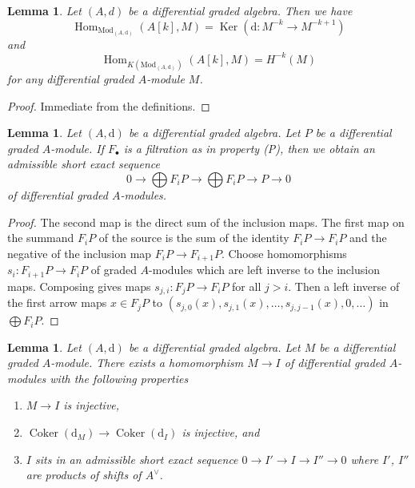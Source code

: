 \documentclass{stacks-project}
\theoremstyle{plain}
\newtheorem{lemma}[subsection]{Lemma}
\theoremstyle{definition}
\theoremstyle{remark}
\numberwithin{equation}{subsection}
\def\Hom{\mathop{\mathrm{Hom}}\nolimits}
\def\Ker{\mathop{\mathrm{Ker}}}
\def\Coker{\mathop{\mathrm{Coker}}}
\begin{document}
\begin{lemma}
\label{lemma-hom-from-shift-free}
Let $(A, d)$ be a differential graded algebra. Then we have
$$
\Hom_{\text{Mod}_{(A, \text{d})}}(A[k], M) =
\Ker(\text{d} : M^{-k} \to M^{-k + 1})
$$
and
$$
\Hom_{K(\text{Mod}_{(A, \text{d})})}(A[k], M) = H^{-k}(M)
$$
for any differential graded $A$-module $M$.
\end{lemma}

\begin{proof}
Immediate from the definitions.
\end{proof}

\begin{lemma}
\label{lemma-property-P-sequence}
Let $(A, \text{d})$ be a differential graded algebra.
Let $P$ be a differential graded $A$-module. If $F_\bullet$
is a filtration as in property (P), then we obtain an
admissible short exact sequence
$$
0 \to
\bigoplus\nolimits F_iP \to
\bigoplus\nolimits F_iP \to P \to 0
$$
of differential graded $A$-modules.
\end{lemma}

\begin{proof}
The second map is the direct sum of the inclusion maps.
The first map on the summand $F_iP$ of the source is the sum
of the identity $F_iP \to F_iP$ and the negative of the inclusion
map $F_iP \to F_{i + 1}P$. Choose homomorphisms $s_i : F_{i + 1}P \to F_iP$
of graded $A$-modules which are left inverse to the inclusion maps.
Composing gives maps $s_{j, i} : F_jP \to F_iP$ for all $j > i$.
Then a left inverse of the first arrow maps $x \in F_jP$ to
$(s_{j, 0}(x), s_{j, 1}(x), \ldots, s_{j, j - 1}(x), 0, \ldots)$
in $\bigoplus F_iP$.
\end{proof}

\begin{lemma}
\label{lemma-good-sub}
Let $(A, \text{d})$ be a differential graded algebra.
Let $M$ be a differential graded $A$-module. There exists a homomorphism
$M \to I$ of differential graded $A$-modules with the following
properties
\begin{enumerate}
\item $M \to I$ is injective,
\item $\Coker(\text{d}_M) \to \Coker(\text{d}_I)$ is injective,
and
\item $I$ sits in an admissible short exact sequence
$0 \to I' \to I \to I'' \to 0$ where $I'$, $I''$ are products
of shifts of $A^\vee$.
\end{enumerate}
\end{lemma}
\end{document}
